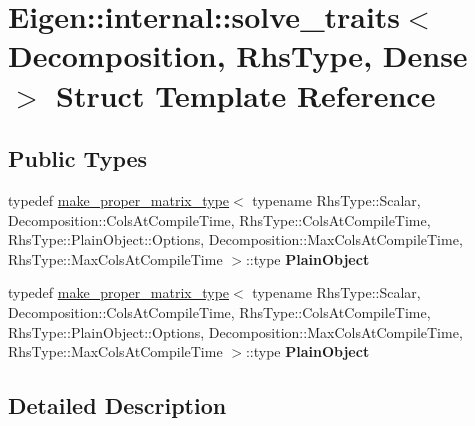 \hypertarget{struct_eigen_1_1internal_1_1solve__traits_3_01_decomposition_00_01_rhs_type_00_01_dense_01_4}{}\section{Eigen\+:\+:internal\+:\+:solve\+\_\+traits$<$ Decomposition, Rhs\+Type, Dense $>$ Struct Template Reference}
\label{struct_eigen_1_1internal_1_1solve__traits_3_01_decomposition_00_01_rhs_type_00_01_dense_01_4}
\subsection*{Public Types}
\begin{DoxyCompactItemize}
\item 
\mbox{\label{struct_eigen_1_1internal_1_1solve__traits_3_01_decomposition_00_01_rhs_type_00_01_dense_01_4_a9d9672967a26b20182d5345b0d5cd4ef}} 
typedef \hyperlink{class_eigen_1_1internal_1_1make__proper__matrix__type}{make\+\_\+proper\+\_\+matrix\+\_\+type}$<$ typename Rhs\+Type\+::\+Scalar, Decomposition\+::\+Cols\+At\+Compile\+Time, Rhs\+Type\+::\+Cols\+At\+Compile\+Time, Rhs\+Type\+::\+Plain\+Object\+::\+Options, Decomposition\+::\+Max\+Cols\+At\+Compile\+Time, Rhs\+Type\+::\+Max\+Cols\+At\+Compile\+Time $>$\+::type {\bfseries Plain\+Object}
\item 
\mbox{\label{struct_eigen_1_1internal_1_1solve__traits_3_01_decomposition_00_01_rhs_type_00_01_dense_01_4_a9d9672967a26b20182d5345b0d5cd4ef}} 
typedef \hyperlink{class_eigen_1_1internal_1_1make__proper__matrix__type}{make\+\_\+proper\+\_\+matrix\+\_\+type}$<$ typename Rhs\+Type\+::\+Scalar, Decomposition\+::\+Cols\+At\+Compile\+Time, Rhs\+Type\+::\+Cols\+At\+Compile\+Time, Rhs\+Type\+::\+Plain\+Object\+::\+Options, Decomposition\+::\+Max\+Cols\+At\+Compile\+Time, Rhs\+Type\+::\+Max\+Cols\+At\+Compile\+Time $>$\+::type {\bfseries Plain\+Object}
\end{DoxyCompactItemize}


\subsection{Detailed Description}
